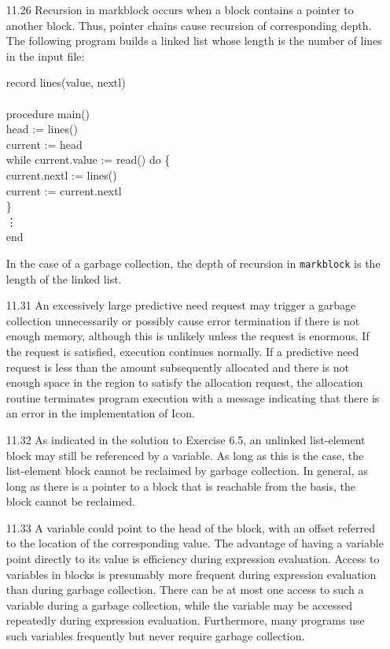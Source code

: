 \begin{itemize}
\goodbreak\item[11.26]
Recursion in markblock occurs when a block contains a pointer to another
block. Thus, pointer chains cause recursion of corresponding depth. The
following program builds a linked list whose length is the number of lines
in the input file:
\begin{iconcode}
record lines(value, nextl)\\
\\
procedure main()\\
\>head := lines()\\
\>current := head\\
\>while current.value := read() do \{\\
\>\>current.nextl := lines()\\
\>\>current := current.nextl\\
\>\}\\
\>\>\vdots\\
end
\end{iconcode}
In the case of a garbage collection, the depth of recursion in \texttt{markblock}
is the length of the linked list.

\goodbreak\item[11.31]
An excessively large predictive need request may trigger a garbage collection
unnecessarily or possibly cause error termination if there is not
enough memory, although this is unlikely unless the request is enormous.
If the request is satisfied, execution continues normally. If a predictive
need request is less than the amount subsequently allocated and there is
not enough space in the region to satisfy the allocation request, the allocation
routine terminates program execution with a message indicating that
there is an error in the implementation of Icon.

\goodbreak\item[11.32]
As indicated in the solution to Exercise 6.5, an unlinked list-element
block may still be referenced by a variable. As long as this is the case, the
list-element block cannot be reclaimed by garbage collection. In general,
as long as there is a pointer to a block that is reachable from the basis, the
block cannot be reclaimed.

\goodbreak\item[11.33]
A variable could point to the head of the block, with an offset referred to
the location of the corresponding value. The advantage of having a variable
point directly to its value is efficiency during expression evaluation.
Access to variables in blocks is presumably more frequent during expression
evaluation than during garbage collection. There can be at most one
access to such a variable during a garbage collection, while the variable
may be accessed repeatedly during expression evaluation. Furthermore,
many programs use such variables frequently but never require garbage
collection.


\end{itemize}
